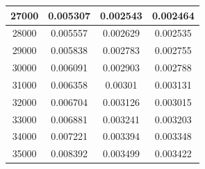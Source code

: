 \begin{center}
\begin{tabular}{| c | c | c | c |}
27000 & 0.005307 & 0.002543 & 0.002464 \\ \hline
28000 & 0.005557 & 0.002629 & 0.002535 \\ \hline
29000 & 0.005838 & 0.002783 & 0.002755 \\ \hline
30000 & 0.006091 & 0.002903 & 0.002788 \\ \hline
31000 & 0.006358 & 0.00301 & 0.003131 \\ \hline
32000 & 0.006704 & 0.003126 & 0.003015 \\ \hline
33000 & 0.006881 & 0.003241 & 0.003203 \\ \hline
34000 & 0.007221 & 0.003394 & 0.003348 \\ \hline
35000 & 0.008392 & 0.003499 & 0.003422 \\ \hline
\hline
\end{tabular}
\end{center}
